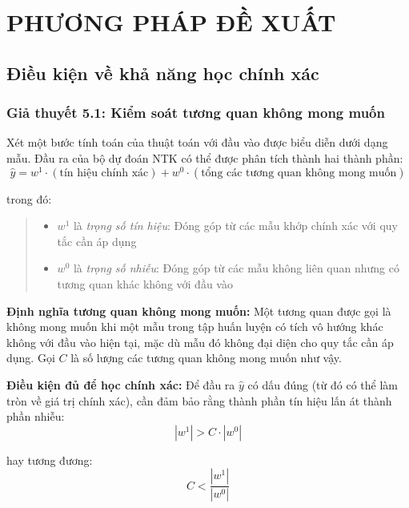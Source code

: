\chapter{PHƯƠNG PHÁP ĐỀ XUẤT}

\section{Điều kiện về khả năng học chính xác}

\subsection{Giả thuyết 5.1: Kiểm soát tương quan không mong muốn}

Xét một bước tính toán của thuật toán với đầu vào được biểu diễn dưới dạng mẫu. Đầu ra của bộ dự đoán NTK có thể được phân tích thành hai thành phần:
\begin{equation}
    \hat{y} = w^1 \cdot (\text{tín hiệu chính xác}) + w^0 \cdot (\text{tổng các tương quan không mong muốn})
\end{equation}

trong đó:
\begin{quote}
\begin{itemize}
    \item $w^1$ là \textit{trọng số tín hiệu}: Đóng góp từ các mẫu khớp chính xác với quy tắc cần áp dụng
    \item $w^0$ là \textit{trọng số nhiễu}: Đóng góp từ các mẫu không liên quan nhưng có tương quan khác không với đầu vào
\end{itemize}
\end{quote}

	\textbf{Định nghĩa tương quan không mong muốn:} Một tương quan được gọi là không mong muốn khi một mẫu trong tập huấn luyện có tích vô hướng khác không với đầu vào hiện tại, mặc dù mẫu đó không đại diện cho quy tắc cần áp dụng. Gọi $C$ là số lượng các tương quan không mong muốn như vậy.

\textbf{Điều kiện đủ để học chính xác:} Để đầu ra $\hat{y}$ có dấu đúng (từ đó có thể làm tròn về giá trị chính xác), cần đảm bảo rằng thành phần tín hiệu lấn át thành phần nhiễu:
\begin{equation}
    |w^1| > C \cdot |w^0|
\end{equation}

hay tương đương:
\begin{equation}
    C < \frac{|w^1|}{|w^0|}
\end{equation}

